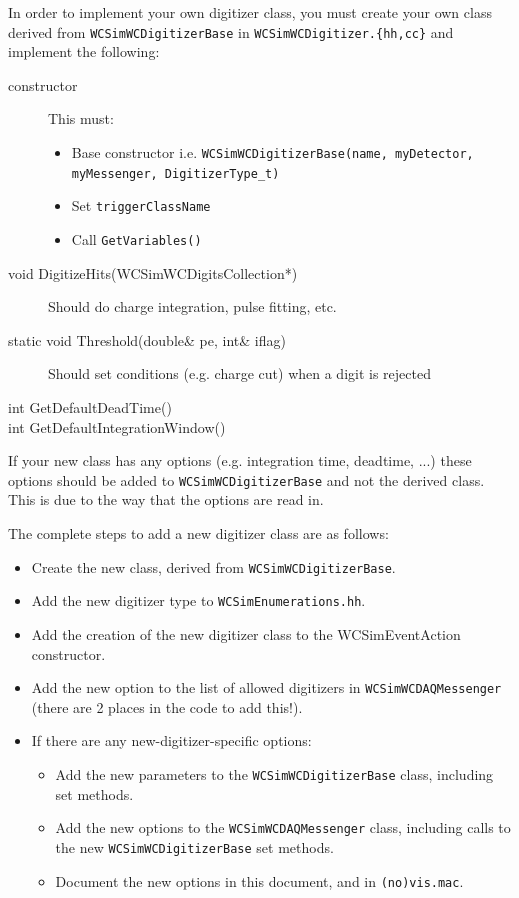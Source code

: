 In order to implement your own digitizer class, you must create your own class derived from \texttt{WCSimWCDigitizerBase} in \texttt{WCSimWCDigitizer.\{hh,cc\}} and implement the following:
\begin{description}
\item[constructor] This must:
  \begin{itemize}
  \item Base constructor i.e. \texttt{WCSimWCDigitizerBase(name, myDetector, myMessenger, DigitizerType\_t)}
  \item Set \texttt{triggerClassName}
  \item Call \texttt{GetVariables()}
  \end{itemize}
\item[void DigitizeHits(WCSimWCDigitsCollection*)] Should do charge integration, pulse fitting, etc.
\item[static void Threshold(double\& pe, int\& iflag)] Should set conditions (e.g. charge cut) when a digit is rejected
\item[int GetDefaultDeadTime()]
\item[int GetDefaultIntegrationWindow()]
\end{description}
If your new class has any options (e.g. integration time, deadtime, ...) these options should be added to \texttt{WCSimWCDigitizerBase} and not the derived class. This is due to the way that the options are read in.

The complete steps to add a new digitizer class are as follows:
\begin{itemize}
\item Create the new class, derived from \texttt{WCSimWCDigitizerBase}.
\item Add the new digitizer type to \texttt{WCSimEnumerations.hh}.
\item Add the creation of the new digitizer class to the WCSimEventAction constructor.
\item Add the new option to the list of allowed digitizers in \texttt{WCSimWCDAQMessenger} (there are 2 places in the code to add this!). 
\item If there are any new-digitizer-specific options:
  \begin{itemize}
  \item Add the new parameters to the \texttt{WCSimWCDigitizerBase} class, including set methods.
  \item Add the new options to the \texttt{WCSimWCDAQMessenger} class, including calls to the new \texttt{WCSimWCDigitizerBase} set methods.
  \item Document the new options in this document, and in \texttt{(no)vis.mac}.
  \end{itemize}
\end{itemize}

